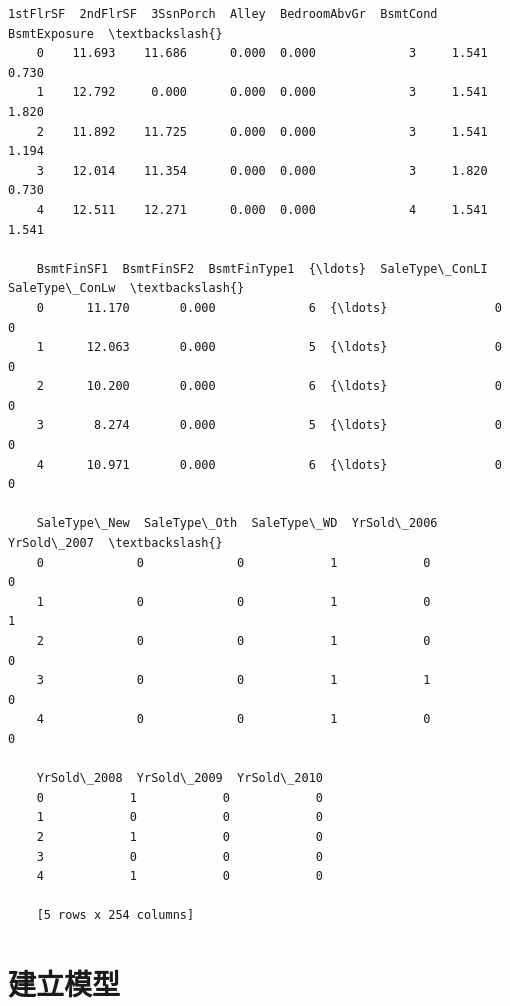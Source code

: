 \documentclass[no-math]{YangThesis}
\begin{document}
\begin{tcolorbox}[breakable, size=fbox, boxrule=.5pt, pad at break*=1mm, opacityfill=0]
	\begin{Verbatim}[commandchars=\\\{\}]
	1stFlrSF  2ndFlrSF  3SsnPorch  Alley  BedroomAbvGr  BsmtCond  BsmtExposure  \textbackslash{}
	0    11.693    11.686      0.000  0.000             3     1.541         0.730
	1    12.792     0.000      0.000  0.000             3     1.541         1.820
	2    11.892    11.725      0.000  0.000             3     1.541         1.194
	3    12.014    11.354      0.000  0.000             3     1.820         0.730
	4    12.511    12.271      0.000  0.000             4     1.541         1.541
	
	BsmtFinSF1  BsmtFinSF2  BsmtFinType1  {\ldots}  SaleType\_ConLI  SaleType\_ConLw  \textbackslash{}
	0      11.170       0.000             6  {\ldots}               0               0
	1      12.063       0.000             5  {\ldots}               0               0
	2      10.200       0.000             6  {\ldots}               0               0
	3       8.274       0.000             5  {\ldots}               0               0
	4      10.971       0.000             6  {\ldots}               0               0
	
	SaleType\_New  SaleType\_Oth  SaleType\_WD  YrSold\_2006  YrSold\_2007  \textbackslash{}
	0             0             0            1            0            0
	1             0             0            1            0            1
	2             0             0            1            0            0
	3             0             0            1            1            0
	4             0             0            1            0            0
	
	YrSold\_2008  YrSold\_2009  YrSold\_2010
	0            1            0            0
	1            0            0            0
	2            1            0            0
	3            0            0            0
	4            1            0            0
	
	[5 rows x 254 columns]
	\end{Verbatim}
\end{tcolorbox}

\hypertarget{ux5efaux7acbux6a21ux578b}{%
	\section{建立模型}\label{ux5efaux7acbux6a21ux578b}}
\end{document}
